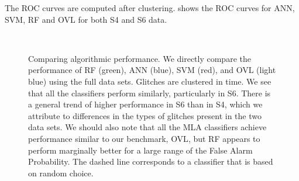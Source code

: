 \documentclass[prd, twocolumn, lengthcheck, superscriptaddress, showpacs, letterpaper, nofootinbib]{revtex4-1}
\begin{document}
The  \ac{ROC} curves  are computed after clustering.  shows the \ac{ROC} curves for \ac{ANN}, \ac{SVM}, \ac{RF} and \ac{OVL} for both S4 and S6 data. 


\begin{figure}[h!]
\centering
{}\\
\caption{Comparing algorithmic performance. We directly compare the performance of \ac{RF} (green), \ac{ANN} (blue), \ac{SVM} (red), and \ac{OVL} (light blue) using the full data sets. Glitches are clustered in time. We see that all the classifiers perform similarly, particularly in S6. There is a general trend of higher performance in S6 than in S4, which we attribute to differences in the types of glitches present in the two data sets. We should also note that all the MLA classifiers achieve performance similar to our benchmark, \ac{OVL}, but \ac{RF} appears to perform marginally better for a large range of the False Alarm Probability. The dashed line corresponds to a classifier that is based on random choice.}
\label{fig:ROC_curves}
\end{figure}
\end{document}

